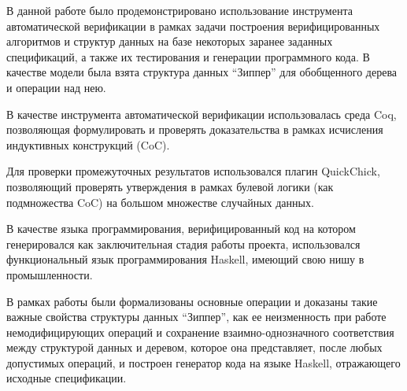 В данной работе было продемонстрировано использование инструмента автоматической верификации в рамках задачи построения верифицированных алгоритмов и структур данных на базе некоторых заранее заданных спецификаций, а также их тестирования и генерации программного кода. В качестве модели была взята структура данных ``Зиппер'' для обобщенного дерева и операции над нею.

В качестве инструмента автоматической верификации использовалась среда Coq, позволяющая формулировать и проверять доказательства в рамках исчисления индуктивных конструкций (CoC).

Для проверки промежуточных результатов использовался плагин QuickChick, позволяющий проверять утверждения в рамках булевой логики (как подмножества CoC) на большом множестве случайных данных.

В качестве языка программирования, верифицированный код на котором генерировался как заключительная стадия работы проекта, использовался функциональный язык программирования Haskell, имеющий свою нишу в промышленности.

В рамках работы были формализованы основные операции и доказаны такие важные свойства структуры данных ``Зиппер'', как ее неизменность при работе немодифицирующих операций и сохранение взаимно-однозначного соответствия между структурой данных и деревом, которое она представляет, после любых допустимых операций, и построен генератор кода на языке Haskell, отражающего исходные спецификации.

\newpage

\printbibliography[%
    heading=bibintoc%
]

\appendix
{}


